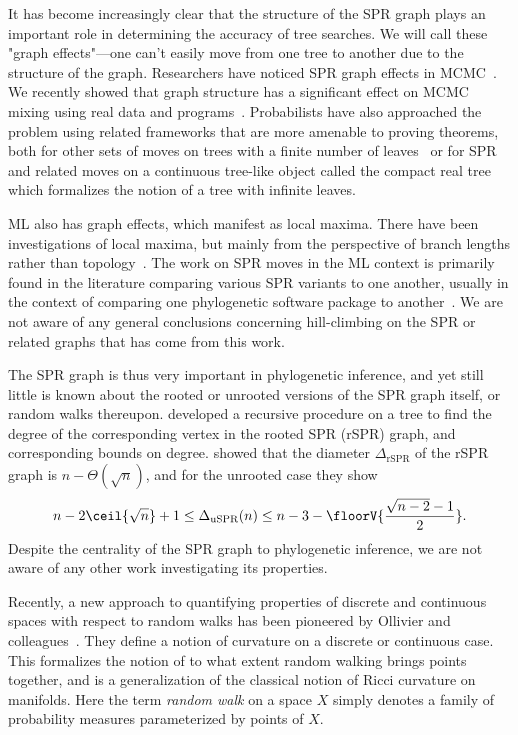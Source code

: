 \documentclass[11pt,onecolumn,conference]{IEEEtran}
\begin{document}
It has become increasingly clear that the structure of the SPR graph plays an important role in determining the accuracy of tree searches.
We will call these "graph effects"---one can't easily move from one tree to another due to the structure of the graph.
Researchers have noticed SPR graph effects in MCMC~\cite{Mossel2005-ly,Mossel2006-fo,Ronquist2006-fv,Stefankovic2011-hu}.
We recently showed that graph structure has a significant effect on MCMC mixing using real data and programs~\cite{Whidden2015-yi}.
Probabilists have also approached the problem using related frameworks that are more amenable to proving theorems, both for other sets of moves on trees with a finite number of leaves~\cite{Aldous2000-vg,Diaconis2002-gy} or for SPR and related moves on a continuous tree-like object called the compact real tree which formalizes the notion of a tree with infinite leaves\cite{Evans2006-xh,Athreya2014-de}.

ML also has graph effects, which manifest as local maxima.
There have been investigations of local maxima, but mainly from the perspective of branch lengths rather than topology~\cite{Fukami1989-fs,Steel1994-pt,Chor2003-wh,Chor2000-ea}.
The work on SPR moves in the ML context is primarily found in the literature comparing various SPR variants to one another, usually in the context of comparing one phylogenetic software package to another~\cite{Hordijk2005-dl,Stamatakis2006-yz,Price2010-fi,Guindon2010-lo}.
We are not aware of any general conclusions concerning hill-climbing on the SPR or related graphs that has come from this work.

The SPR graph is thus very important in phylogenetic inference, and yet still little is known about the rooted or unrooted versions of the SPR graph itself, or random walks thereupon.
\cite{Song2003-gf} developed a recursive procedure on a tree to find the degree of the corresponding vertex in the rooted SPR (rSPR) graph, and corresponding bounds on degree.
\cite{Ding2011-bj} showed that the diameter $\Delta_{\text{rSPR}}$ of the rSPR graph is $n - \Theta(\sqrt n)$, and for the unrooted case they show
$$ n - 2\ceil{\sqrt{n}} + 1
\le \Delta_{\text{uSPR}}(n)
\le n - 3 - \floorV{\frac{\sqrt{n - 2} - 1}{2}}.
$$
Despite the centrality of the SPR graph to phylogenetic inference, we are not aware of any other work investigating its properties.

Recently, a new approach to quantifying properties of discrete and continuous spaces with respect to random walks has been pioneered by Ollivier and colleagues~\cite{Ollivier2009-bw,Joulin2010-jg}.
They define a notion of curvature on a discrete or continuous case.
This formalizes the notion of to what extent random walking brings points together, and is a generalization of the classical notion of Ricci curvature on manifolds.
Here the term \emph{random walk} on a space $X$ simply denotes a family of probability measures parameterized by points of $X$.
\end{document}
